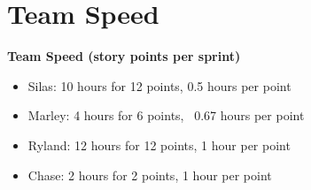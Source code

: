 \section{Team Speed}
\textbf{Team Speed (story points per sprint)}
\begin{itemize}
    \item Silas: 10 hours for 12 points, 0.5 hours per point
    \item Marley: 4 hours for 6 points, ~0.67 hours per point
    \item Ryland: 12 hours for 12 points, 1 hour per point
    \item Chase: 2 hours for 2 points, 1 hour per point
\end{itemize}